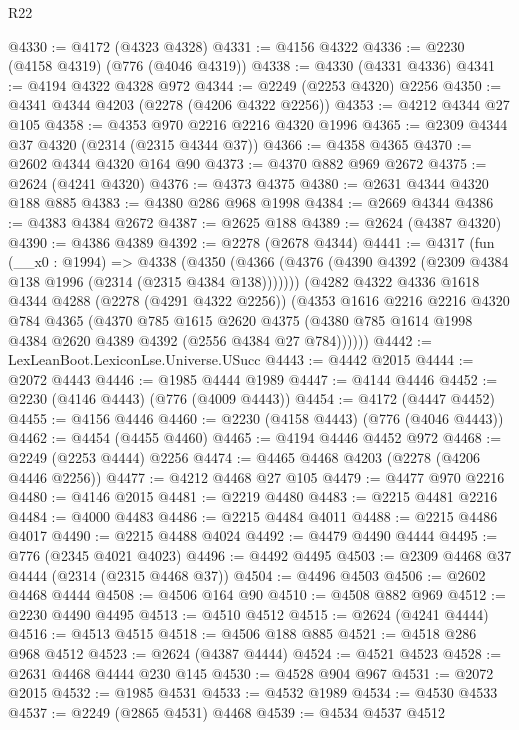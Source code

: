 \begin{lexlean}{R22}
\begin{coremodule}
@4330 := @4172 (@4323 @4328)
@4331 := @4156 @4322
@4336 := @2230 (@4158 @4319) (@776 (@4046 @4319))
@4338 := @4330 (@4331 @4336)
@4341 := @4194 @4322 @4328 @972
@4344 := @2249 (@2253 @4320) @2256
@4350 := @4341 @4344 @4203 (@2278 (@4206 @4322 @2256))
@4353 := @4212 @4344 @27 @105
@4358 := @4353 @970 @2216 @2216 @4320 @1996
@4365 := @2309 @4344 @37 @4320 (@2314 (@2315 @4344 @37))
@4366 := @4358 @4365
@4370 := @2602 @4344 @4320 @164 @90
@4373 := @4370 @882 @969 @2672
@4375 := @2624 (@4241 @4320)
@4376 := @4373 @4375
@4380 := @2631 @4344 @4320 @188 @885
@4383 := @4380 @286 @968 @1998
@4384 := @2669 @4344
@4386 := @4383 @4384 @2672
@4387 := @2625 @188
@4389 := @2624 (@4387 @4320)
@4390 := @4386 @4389
@4392 := @2278 (@2678 @4344)
@4441 := @4317
    (fun (__x0 : @1994) =>
    @4338
      (@4350 (@4366 (@4376 (@4390 @4392 (@2309 @4384 @138 @1996 (@2314 (@2315 @4384 @138)))))))
      (@4282
        @4322
        @4336
        @1618
        @4344
        @4288
        (@2278 (@4291 @4322 @2256))
        (@4353
          @1616
          @2216
          @2216
          @4320
          @784
          @4365
          (@4370
            @785
            @1615
            @2620
            @4375
            (@4380 @785 @1614 @1998 @4384 @2620 @4389 @4392 (@2556 @4384 @27 @784))))))
@4442 := LexLeanBoot.LexiconLse.Universe.USucc
@4443 := @4442 @2015
@4444 := @2072 @4443
@4446 := @1985 @4444 @1989
@4447 := @4144 @4446
@4452 := @2230 (@4146 @4443) (@776 (@4009 @4443))
@4454 := @4172 (@4447 @4452)
@4455 := @4156 @4446
@4460 := @2230 (@4158 @4443) (@776 (@4046 @4443))
@4462 := @4454 (@4455 @4460)
@4465 := @4194 @4446 @4452 @972
@4468 := @2249 (@2253 @4444) @2256
@4474 := @4465 @4468 @4203 (@2278 (@4206 @4446 @2256))
@4477 := @4212 @4468 @27 @105
@4479 := @4477 @970 @2216
@4480 := @4146 @2015
@4481 := @2219 @4480
@4483 := @2215 @4481 @2216
@4484 := @4000 @4483
@4486 := @2215 @4484 @4011
@4488 := @2215 @4486 @4017
@4490 := @2215 @4488 @4024
@4492 := @4479 @4490 @4444
@4495 := @776 (@2345 @4021 @4023)
@4496 := @4492 @4495
@4503 := @2309 @4468 @37 @4444 (@2314 (@2315 @4468 @37))
@4504 := @4496 @4503
@4506 := @2602 @4468 @4444
@4508 := @4506 @164 @90
@4510 := @4508 @882 @969
@4512 := @2230 @4490 @4495
@4513 := @4510 @4512
@4515 := @2624 (@4241 @4444)
@4516 := @4513 @4515
@4518 := @4506 @188 @885
@4521 := @4518 @286 @968 @4512
@4523 := @2624 (@4387 @4444)
@4524 := @4521 @4523
@4528 := @2631 @4468 @4444 @230 @145
@4530 := @4528 @904 @967
@4531 := @2072 @2015
@4532 := @1985 @4531
@4533 := @4532 @1989
@4534 := @4530 @4533
@4537 := @2249 (@2865 @4531) @4468
@4539 := @4534 @4537 @4512

\end{coremodule}
\end{lexlean}
